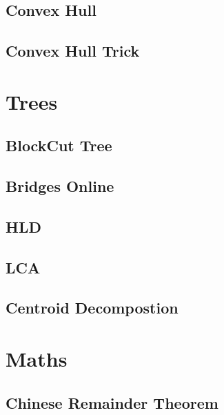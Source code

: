 \subsection{Convex Hull}
\raggedbottom
\hrulefill
\subsection{Convex Hull Trick}
\raggedbottom
\hrulefill

\section{Trees}
\subsection{BlockCut Tree}
\raggedbottom
\hrulefill
\subsection{Bridges Online}
\raggedbottom
\hrulefill
\subsection{HLD}
\raggedbottom
\hrulefill
\subsection{LCA}
\raggedbottom
\hrulefill
\subsection{Centroid Decompostion}
\raggedbottom
\hrulefill

\section{Maths}
\subsection{Chinese Remainder Theorem}
\raggedbottom
\hrulefill

